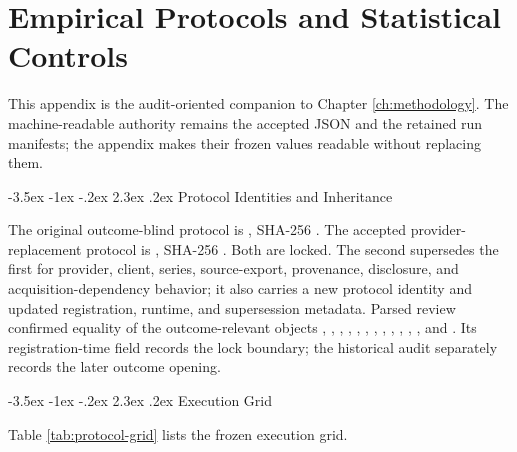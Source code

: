 \documentclass[12pt,a4paper,oneside]{report}
\makeatletter
\renewcommand\section{\@startsection{section}{1}{\z@}%
  {-3.5ex \@plus -1ex \@minus -.2ex}%
  {2.3ex \@plus .2ex}%
  {\normalfont\fontsize{14}{17}\selectfont\bfseries}}
\makeatother
\begin{document}
\chapter{Empirical Protocols and Statistical Controls}
\label{app:protocols}

This appendix is the audit-oriented companion to Chapter
\ref{ch:methodology}. The machine-readable authority remains the accepted JSON
and the retained run manifests; the appendix makes their frozen values readable
without replacing them.

\section{Protocol Identities and Inheritance}
\label{sec:appendix-protocol-identities}

\begin{sloppypar}
The original outcome-blind protocol is
, SHA-256
.
The accepted provider-replacement protocol is
, SHA-256
.
Both are locked. The second supersedes the first for provider, client,
series, source-export, provenance, disclosure, and acquisition-dependency
behavior; it also carries a new protocol identity and updated registration,
runtime, and supersession metadata. Parsed review confirmed equality of the
outcome-relevant objects
, , ,
, , ,
, , ,
, , ,
and . Its registration-time
 field records the lock boundary;
the historical audit separately records the later outcome opening.
\end{sloppypar}

\section{Execution Grid}
\label{sec:appendix-execution-grid}

Table \ref{tab:protocol-grid} lists the frozen execution grid.
\end{document}
